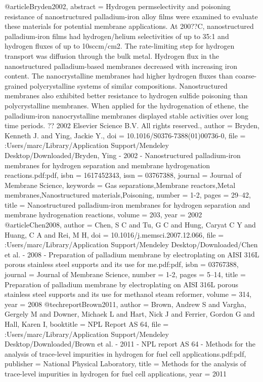 @article{Bryden2002,
abstract = {Hydrogen permselectivity and poisoning resistance of nanostructured palladium-iron alloy films were examined to evaluate these materials for potential membrane applications. At 200??C, nanostructured palladium-iron films had hydrogen/helium selectivities of up to 35:1 and hydrogen fluxes of up to 10sccm/cm2. The rate-limiting step for hydrogen transport was diffusion through the bulk metal. Hydrogen flux in the nanostructured palladium-based membranes decreased with increasing iron content. The nanocrystalline membranes had higher hydrogen fluxes than coarse-grained polycrystalline systems of similar compositions. Nanostructured membranes also exhibited better resistance to hydrogen sulfide poisoning than polycrystalline membranes. When applied for the hydrogenation of ethene, the palladium-iron nanocrystalline membranes displayed stable activities over long time periods. ?? 2002 Elsevier Science B.V. All rights reserved.},
author = {Bryden, Kenneth J. and Ying, Jackie Y.},
doi = {10.1016/S0376-7388(01)00736-0},
file = {:Users/marc/Library/Application Support/Mendeley Desktop/Downloaded/Bryden, Ying - 2002 - Nanostructured palladium-iron membranes for hydrogen separation and membrane hydrogenation reactions.pdf:pdf},
isbn = {1617452343},
issn = {03767388},
journal = {Journal of Membrane Science},
keywords = {Gas separations,Membrane reactors,Metal membranes,Nanostructured materials,Poisoning},
number = {1-2},
pages = {29--42},
title = {{Nanostructured palladium-iron membranes for hydrogen separation and membrane hydrogenation reactions}},
volume = {203},
year = {2002}
}
@article{Chen2008,
author = {Chen, S C and Tu, G C and Hung, Caryat C Y and Huang, C A and Rei, M H},
doi = {10.1016/j.memsci.2007.12.066},
file = {:Users/marc/Library/Application Support/Mendeley Desktop/Downloaded/Chen et al. - 2008 - Preparation of palladium membrane by electroplating on AISI 316L porous stainless steel supports and its use for me.pdf:pdf},
isbn = {03767388},
journal = {Journal of Membrane Science},
number = {1-2},
pages = {5--14},
title = {{Preparation of palladium membrane by electroplating on AISI 316L porous stainless steel supports and its use for methanol steam reformer}},
volume = {314},
year = {2008}
}
@techreport{Brown2011,
author = {Brown, Andrew S and Vargha, Gergely M and Downer, Michaek L and Hart, Nick J and Ferrier, Gordon G and Hall, Karen I},
booktitle = {NPL Report AS 64},
file = {:Users/marc/Library/Application Support/Mendeley Desktop/Downloaded/Brown et al. - 2011 - NPL report AS 64 - Methods for the analysis of trace-level impurities in hydrogen for fuel cell applications.pdf:pdf},
publisher = {National Physical Laboratory},
title = {{Methods for the analysis of trace-level impurities in hydrogen for fuel cell applications}},
year = {2011}
}
